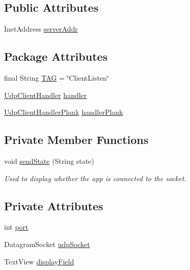 \subsection*{Public Attributes}
\begin{DoxyCompactItemize}
\item 
Inet\+Address \mbox{\hyperlink{classcom_1_1example_1_1trainawearapplication_1_1_client_listen_abc9e0b9f60e38782a9aa64dde9b43273}{server\+Addr}}
\end{DoxyCompactItemize}
\subsection*{Package Attributes}
\begin{DoxyCompactItemize}
\item 
final String \mbox{\hyperlink{classcom_1_1example_1_1trainawearapplication_1_1_client_listen_aa3d3c47992472e26dd06aeeaca91936a}{T\+AG}} = \char`\"{}Client\+Listen\char`\"{}
\item 
\mbox{\hyperlink{classcom_1_1example_1_1trainawearapplication_1_1_udp_client_handler}{Udp\+Client\+Handler}} \mbox{\hyperlink{classcom_1_1example_1_1trainawearapplication_1_1_client_listen_a6d6b6e018a0bc75068445635b2eacd26}{handler}}
\item 
\mbox{\hyperlink{classcom_1_1example_1_1trainawearapplication_1_1_udp_client_handler_plank}{Udp\+Client\+Handler\+Plank}} \mbox{\hyperlink{classcom_1_1example_1_1trainawearapplication_1_1_client_listen_ad3b38ad71c2120e19c5f820053863a64}{handler\+Plank}}
\end{DoxyCompactItemize}
\subsection*{Private Member Functions}
\begin{DoxyCompactItemize}
\item 
void \mbox{\hyperlink{classcom_1_1example_1_1trainawearapplication_1_1_client_listen_ab1d26a5c46561734eef258d64a6d7723}{send\+State}} (String state)
\begin{DoxyCompactList}\small\item\em Used to display whether the app is connected to the socket. \end{DoxyCompactList}\end{DoxyCompactItemize}
\subsection*{Private Attributes}
\begin{DoxyCompactItemize}
\item 
int \mbox{\hyperlink{classcom_1_1example_1_1trainawearapplication_1_1_client_listen_a9835e7e202b86f8b019671b86508313a}{port}}
\item 
Datagram\+Socket \mbox{\hyperlink{classcom_1_1example_1_1trainawearapplication_1_1_client_listen_a008375f58e870216d43730ef43964b61}{udp\+Socket}}
\item 
Text\+View \mbox{\hyperlink{classcom_1_1example_1_1trainawearapplication_1_1_client_listen_a832fe2d0515add95ba938249831116bc}{display\+Field}}
\end{DoxyCompactItemize}


